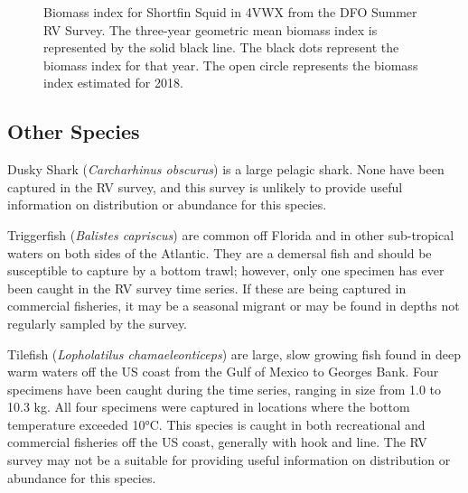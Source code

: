 \documentclass[11pt]{book}
\begin{document}
\begin{figure}[htb]

{\centering {} 

}

\caption{Biomass index for Shortfin Squid in 4VWX from the DFO Summer RV Survey. The three-year geometric mean biomass index is represented by the solid black line. The black dots represent the biomass index for that year. The open circle represents the biomass index estimated for 2018.}\label{fig:129-fig-shortfinsquid-biomass}
\end{figure}
\hypertarget{other-species}{%
\subsection{Other Species}\label{other-species}}

Dusky Shark (\emph{Carcharhinus obscurus}) is a large pelagic shark. None have been captured in the RV survey, and this survey is unlikely to provide useful information on distribution or abundance for this species.

Triggerfish (\emph{Balistes capriscus}) are common off Florida and in other sub-tropical waters on both sides of the Atlantic. They are a demersal fish and should be susceptible to capture by a bottom trawl; however, only one specimen has ever been caught in the RV survey time series. If these are being captured in commercial fisheries, it may be a seasonal migrant or may be found in depths not regularly sampled by the survey.

Tilefish (\emph{Lopholatilus chamaeleonticeps}) are large, slow growing fish found in deep warm waters off the US coast from the Gulf of Mexico to Georges Bank. Four specimens have been caught during the time series, ranging in size from 1.0 to 10.3 kg. All four specimens were captured in locations where the bottom temperature exceeded 10°C. This species is caught in both recreational and commercial fisheries off the US coast, generally with hook and line. The RV survey may not be a suitable for providing useful information on distribution or abundance for this species.
\end{document}
